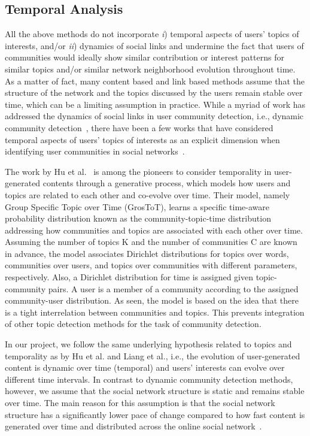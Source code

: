 \documentclass[sigconf]{acmart}
\begin{document}
\subsection{Temporal Analysis}
{\color{blue} All the above methods do not incorporate \textit{i}) temporal aspects of users' topics of interests, and/or \textit{ii}) dynamics of social links and undermine the fact that users of communities would ideally show similar contribution or interest patterns for similar topics and/or similar network neighborhood evolution throughout time. As a matter of fact, many content based and link based methods assume that the structure of the network and the topics discussed by the users remain stable over time, which can be a limiting assumption in practice. While a myriad of work has addressed the dynamics of social links in user community detection, i.e., dynamic community detection~\cite{DBLP:journals/csur/RossettiC18, DBLP:journals/complexity/WuYZSLDH18}, there  have  been  a  few  works  that  have  considered  temporal aspects of users' topics of interests as an explicit dimension when identifying user communities in social networks~\cite{DBLP:conf/aaai/HuYC14, DBLP:conf/sigmod/HuYCX15, DBLP:journals/tois/LiangRZMYR17}. }

The work by Hu et al.~\cite{DBLP:conf/aaai/HuYC14} is among the pioneers to consider temporality in user-generated contents through  a  generative  process, which  models  how  users  and  topics  are  related to  each  other  and  co-evolve  over  time.   Their  model, namely Group Specific Topic over Time (GrosToT), learns a  specific time-aware probability distribution known as the community-topic-time distribution addressing how communities and  topics are associated with each  other over time. Assuming the number of topics K and the number of communities C are known in advance, the model associates Dirichlet distributions for topics over words, communities over users, and topics over communities with different parameters, respectively. Also, a Dirichlet distribution for time is assigned given topic-community pairs. A user is a member of a community according to the assigned community-user distribution. As seen, the model is based on the idea that there is a tight interrelation between communities and topics. This prevents integration of other topic detection methods for the task of community detection. 

{\color{red} In our project, we follow the same underlying hypothesis related to topics and temporality as by Hu et al. and Liang et al., i.e., the evolution of user-generated content is dynamic over time (temporal) and users' interests can evolve over different time intervals. In contrast to dynamic community detection methods, however, we assume that the social network structure is static and remains stable over time.  The main reason for this assumption is that the social network structure has a significantly lower pace of change compared to how fast content is generated over time and distributed across the online social network~\cite{Myers:2014:BDT:2566486.2568043}.} 


 
\end{document}
